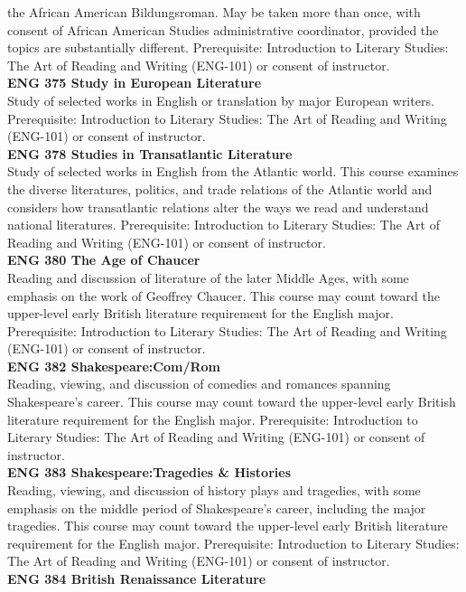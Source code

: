 \documentclass[
  letterpaper,
]{scrbook}
\begin{document}
the African American Bildungsroman. May be taken more than once, with
consent of African American Studies administrative coordinator, provided
the topics are substantially different. Prerequisite: Introduction to
Literary Studies: The Art of Reading and Writing (ENG-101) or consent of
instructor.\\
\textbf{ENG 375 Study in European Literature}\\
Study of selected works in English or translation by major European
writers. Prerequisite: Introduction to Literary Studies: The Art of
Reading and Writing (ENG-101) or consent of instructor.\\
\textbf{ENG 378 Studies in Transatlantic Literature}\\
Study of selected works in English from the Atlantic world. This course
examines the diverse literatures, politics, and trade relations of the
Atlantic world and considers how transatlantic relations alter the ways
we read and understand national literatures. Prerequisite: Introduction
to Literary Studies: The Art of Reading and Writing (ENG-101) or consent
of instructor.\\
\textbf{ENG 380 The Age of Chaucer}\\
Reading and discussion of literature of the later Middle Ages, with some
emphasis on the work of Geoffrey Chaucer. This course may count toward
the upper-level early British literature requirement for the English
major. Prerequisite: Introduction to Literary Studies: The Art of
Reading and Writing (ENG-101) or consent of instructor.\\
\textbf{ENG 382 Shakespeare:Com/Rom}\\
Reading, viewing, and discussion of comedies and romances spanning
Shakespeare's career. This course may count toward the upper-level early
British literature requirement for the English major. Prerequisite:
Introduction to Literary Studies: The Art of Reading and Writing
(ENG-101) or consent of instructor.\\
\textbf{ENG 383 Shakespeare:Tragedies \& Histories}\\
Reading, viewing, and discussion of history plays and tragedies, with
some emphasis on the middle period of Shakespeare's career, including
the major tragedies. This course may count toward the upper-level early
British literature requirement for the English major. Prerequisite:
Introduction to Literary Studies: The Art of Reading and Writing
(ENG-101) or consent of instructor.\\
\textbf{ENG 384 British Renaissance Literature}\\
\end{document}
